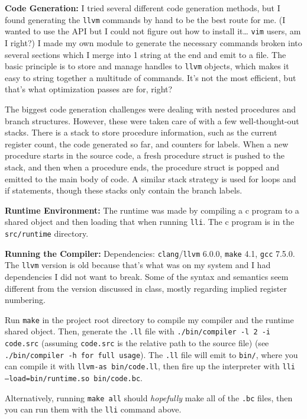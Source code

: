 \documentclass[letterpaper, 12pt, titlepage]{article}
\begin{document}
  \par \textbf{Code Generation:}
  I tried several different code generation methods, but I found generating the
  \texttt{llvm} commands by hand to be the best route for me.
  (I wanted to use the API but I could not figure out how to install it\ldots
  \texttt{vim} users, am I right?)
  I made my own module to generate the necessary commands broken into several
  sections which I merge into 1 string at the end and emit to a file.
  The basic principle is to store and manage handles to \texttt{llvm} objects,
  which makes it easy to string together a multitude of commands.
  It's not the most efficient, but that's what optimization passes are for,
  right?

  \par The biggest code generation challenges were dealing with nested
  procedures and branch structures.
  However, these were taken care of with a few well-thought-out stacks.
  There is a stack to store procedure information, such as the current register
  count, the code generated so far, and counters for labels.
  When a new procedure starts in the source code, a fresh procedure struct is
  pushed to the stack, and then when a procedure ends, the procedure struct is
  popped and emitted to the main body of code.
  A similar stack strategy is used for loops and if statements, though these
  stacks only contain the branch labels.

  \par \textbf{Runtime Environment:}
  The runtime was made by compiling a c program to a shared object and then
  loading that when running \texttt{lli}.
  The c program is in the \texttt{src/runtime} directory.

  \par \textbf{Running the Compiler:}
  Dependencies: \texttt{clang}/\texttt{llvm} 6.0.0, \texttt{make} 4.1,
  \texttt{gcc} 7.5.0.
  The \texttt{llvm} version is old because that's what was on my system and I
  had dependencies I did not want to break.
  Some of the syntax and semantics seem different from the version discussed in
  class, mostly regarding implied register numbering.
  \par Run \texttt{make} in the project root directory to compile my compiler
  and the runtime shared object.
  Then, generate the \texttt{.ll} file with \texttt{./bin/compiler -l 2 -i
  code.src} (assuming \texttt{code.src} is the relative path to the source
  file) (see \texttt{./bin/compiler -h for full usage}).
  The \texttt{.ll} file will emit to \texttt{bin/}, where you can compile it
  with \texttt{llvm-as bin/code.ll}, then fire up the interpreter with
  \texttt{lli --load=bin/runtime.so bin/code.bc}.
  \par Alternatively, running \texttt{make all} should \textit{hopefully} make
  all of the \texttt{.bc} files, then you can run them with the \texttt{lli}
  command above.
\end{document}
